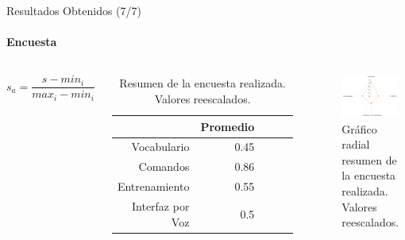 \begin{frame}{Resultados Obtenidos (7/7)}
\framesubtitle{Encuesta}

\begin{columns}
\begin{equation*}
s_a=\frac{s-min_i}{max_i-min_i}
\end{equation*}

\begin{table}[H] 
\centering
\tiny
\begin{tabular}{|r|r|r|r|r|}
\hline
            & Promedio \\
\hline
Vocabulario    & 0.45 \\
Comandos    & 0.86 \\
Entrenamiento  & 0.55 \\
Interfaz por Voz & 0.5 \\
\hline
\end{tabular}
\caption{Resumen de la encuesta realizada. Valores reescalados.}
\label{sec:tabla-encuesta-normalizada}
\end{table}
\begin{figure}[ht]
\centering
\includegraphics[width=1\linewidth]{./graphics/kiviat.png}
\caption{Gr\'afico radial resumen de la encuesta realizada. Valores reescalados.}
\label{figure:kiviat-encuesta2}
\end{figure}
\end{columns}
\end{frame}